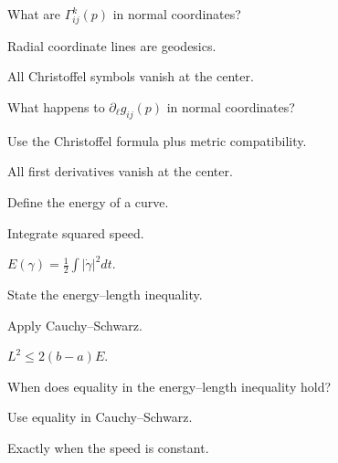 \begin{exercise}\label{exr:vii23-13}
What are \(\Gamma^k_{ij}(p)\) in normal coordinates?
\end{exercise}
\begin{hint}
Radial coordinate lines are geodesics.
\end{hint}
\begin{solution}
All Christoffel symbols vanish at the center.
\end{solution}


\begin{exercise}\label{exr:vii23-14}
What happens to \(\partial_\ell g_{ij}(p)\) in normal coordinates?
\end{exercise}
\begin{hint}
Use the Christoffel formula plus metric compatibility.
\end{hint}
\begin{solution}
All first derivatives vanish at the center.
\end{solution}


\begin{exercise}\label{exr:vii23-15}
Define the energy of a curve.
\end{exercise}
\begin{hint}
Integrate squared speed.
\end{hint}
\begin{solution}
\(E(\gamma)=\frac12\int|\dot\gamma|^2dt\).
\end{solution}


\begin{exercise}\label{exr:vii23-16}
State the energy--length inequality.
\end{exercise}
\begin{hint}
Apply Cauchy--Schwarz.
\end{hint}
\begin{solution}
\(L^2\le2(b-a)E\).
\end{solution}


\begin{exercise}\label{exr:vii23-17}
When does equality in the energy--length inequality hold?
\end{exercise}
\begin{hint}
Use equality in Cauchy--Schwarz.
\end{hint}
\begin{solution}
Exactly when the speed is constant.
\end{solution}


